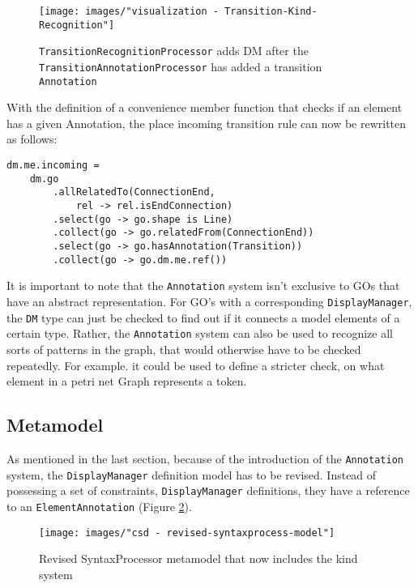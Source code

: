 \begin{figure}[ht]
\centering
\texttt{[image: images/"visualization - Transition-Kind-Recognition"]}
\caption{\texttt{TransitionRecognitionProcessor} adds DM after the \texttt{TransitionAnnotationProcessor} has added a transition \texttt{Annotation}}
\label{fig:Transition-Kind-Recognition}
\end{figure}

With the definition of a convenience member function that checks if an element has a given Annotation, the place incoming transition rule can now be rewritten as follows: 
\begin{lstlisting}[captionpos=b,caption={Improved incoming transition \texttt{Rule}, that also filters for elements with a \texttt{Transition} annotation}]
dm.me.incoming = 
    dm.go
        .allRelatedTo(ConnectionEnd,
            rel -> rel.isEndConnection)
        .select(go -> go.shape is Line)
        .collect(go -> go.relatedFrom(ConnectionEnd))
        .select(go -> go.hasAnnotation(Transition))
        .collect(go -> go.dm.me.ref())
\end{lstlisting}


It is important to note that the \texttt{Annotation} system isn't exclusive to GOs that have an abstract representation. For GO's with a corresponding \texttt{DisplayManager}, the \texttt{DM} type can just be checked to find out if it connects a model elements of a certain type. Rather, the \texttt{Annotation} system can also be used to recognize all sorts of patterns in the graph, that would otherwise have to be checked repeatedly. For example. it could be used to define a stricter check, on what element in a petri net Graph represents a token.

\subsection{Metamodel}
As mentioned in the last section, because of the introduction of the \texttt{Annotation} system, the \texttt{DisplayManager} definition model has to be revised. Instead of possessing a set of constraints, \texttt{DisplayManager} definitions, they have a reference to an \texttt{ElementAnnotation} (Figure \ref{fig:revised-syntax-model}).

\begin{figure}
\centering
\texttt{[image: images/"csd - revised-syntaxprocess-model"]}
\caption{Revised SyntaxProcessor metamodel that now includes the kind system}
\label{fig:revised-syntax-model}
\end{figure}


